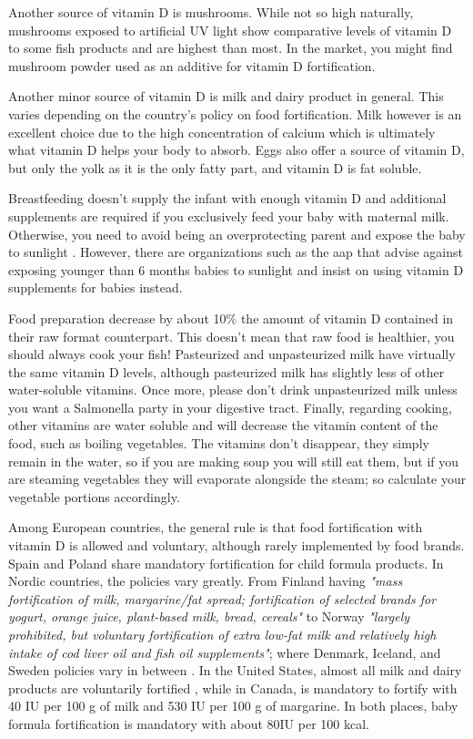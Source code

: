 Another source of vitamin D is mushrooms. While not so high naturally, mushrooms exposed to artificial UV light show comparative levels of vitamin D to some fish products and are highest than most. In the market, you might find mushroom powder used as an additive for vitamin D fortification.

Another minor source of vitamin D is milk and dairy product in general. This varies depending on the country's policy on food fortification. Milk however is an excellent choice due to the high concentration of calcium which is ultimately what vitamin D helps your body to absorb. Eggs also offer a source of vitamin D, but only the yolk as it is the only fatty part, and vitamin D is fat soluble.

Breastfeeding doesn't supply the infant with enough vitamin D and additional supplements are required if you exclusively feed your baby with maternal milk. Otherwise, you need to avoid being an overprotecting parent and expose the baby to sunlight \cite{ref:Meena2017-fs}. However, there are organizations such as the \gls{aap} that advise against exposing younger than 6 months babies to sunlight and insist on using vitamin D supplements for babies \cite{ref:Dawodu2012, ref:Davis2007} instead.

Food preparation decrease by about 10\% the amount of vitamin D contained in their raw format counterpart. This doesn't mean that raw food is healthier, you should always cook your fish! Pasteurized and unpasteurized milk have virtually the same vitamin D levels, although pasteurized milk has slightly less of other water-soluble vitamins. Once more, please don't drink unpasteurized milk unless you want a Salmonella party in your digestive tract. Finally, regarding cooking, other vitamins are water soluble and will decrease the vitamin content of the food, such as boiling vegetables. The vitamins don't disappear, they simply remain in the water, so if you are making soup you will still eat them, but if you are steaming vegetables they will evaporate alongside the steam; so calculate your vegetable portions accordingly.

Among European countries, the general rule is that food fortification with vitamin D is allowed and voluntary, although rarely implemented by food brands. Spain and Poland share mandatory fortification for child formula products. In Nordic countries, the policies vary greatly. From Finland having \textit{"mass fortification of milk, margarine/fat spread; fortification of selected brands for yogurt, orange juice, plant-based milk, bread, cereals"} to Norway \textit{"largely prohibited, but voluntary fortification of extra low-fat milk and relatively high intake of cod liver oil and fish oil supplements"}; where Denmark, Iceland, and Sweden policies vary in between \cite{ref:Niedermaier2022-rv}. In the United States, almost all milk and dairy products are voluntarily fortified \cite{ref:Yetley2008-wf}, while in Canada, is mandatory to fortify with 40 IU per 100 g of milk and 530 IU per 100 g of margarine. In both places, baby formula fortification is mandatory with about 80IU per 100 kcal.\cite{ref:1_Institute_of_Medicine2011-zg}

